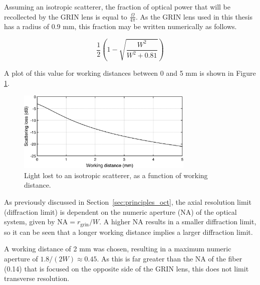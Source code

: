 Assuming an isotropic scatterer, the fraction of optical power that will be recollected by the GRIN lens is equal to $\frac{\Omega}{4 \pi}$. As the GRIN lens used in this thesis has a radius of 0.9 mm, this fraction may be written numerically as follows.

\begin{equation}
\frac{1}{2} \left( 1 - \sqrt{\frac{W^2}{W^2 + 0.81}} \right)
\end{equation}

A plot of this value for working distances between 0 and 5 mm is shown in Figure \ref{fig:wd}.

\begin{figure}[h!]
\centering
\includegraphics[width=0.75\textwidth]{Images/System/grin_scattering2.png}
\caption[Light lost to an isotropic scatterer, as a function of working distance.]{Light lost to an isotropic scatterer, as a function of working distance. \label{fig:wd}}
\end{figure}

As previously discussed in Section~\ref{sec:principles_oct}, the axial resolution limit (diffraction limit) is dependent on the numeric aperture (NA) of the optical system, given by $\mathrm{NA} = r_{\mathrm{grin}}/W$. A higher NA results in a smaller diffraction limit, so it can be seen that a longer working distance implies a larger diffraction limit.



A working distance of 2 mm was chosen, resulting in a maximum numeric aperture of $1.8/(2W) \approx 0.45$. As this is far greater than the NA of the fiber (0.14) that is focused on the opposite side of the GRIN lens, this does not limit transverse resolution. %

